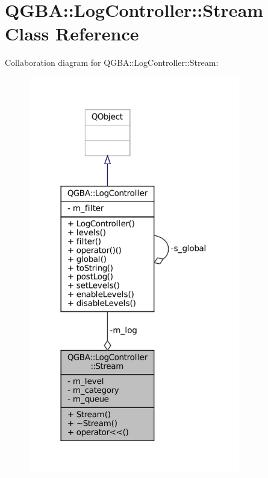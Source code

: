 \hypertarget{class_q_g_b_a_1_1_log_controller_1_1_stream}{}\section{Q\+G\+BA\+:\+:Log\+Controller\+:\+:Stream Class Reference}
\label{class_q_g_b_a_1_1_log_controller_1_1_stream}


Collaboration diagram for Q\+G\+BA\+:\+:Log\+Controller\+:\+:Stream\+:
\nopagebreak
\begin{figure}[H]
\begin{center}
\leavevmode
\includegraphics[width=262pt]{class_q_g_b_a_1_1_log_controller_1_1_stream__coll__graph}
\end{center}
\end{figure}
